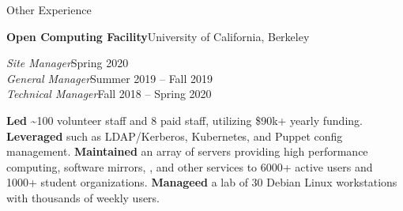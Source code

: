 




  \vspace{10pt}

  {\sectionfont Other Experience}

  \vspace{5pt}
  \textbf{Open Computing Facility}\quad{}\hfill University of California, Berkeley
  \begin{adjustwidth}{10pt}{}
    \emph{Site Manager}\hfill Spring 2020\\
    \emph{General Manager}\hfill Summer 2019 -- Fall 2019\\
    \emph{Technical Manager}\hfill Fall 2018 -- Spring 2020

    \textbf{Led} \textasciitilde{}100 volunteer staff and 8 paid staff, utilizing \$90k+ yearly funding.
    \textbf{Leveraged}  such as LDAP/Kerberos, Kubernetes, and Puppet config management.
    \textbf{Maintained} an array of servers providing high performance computing, software mirrors, , and other services to 6000+ active users and 1000+ student organizations.
    \textbf{Manageed} a lab of 30 Debian Linux workstations with thousands of weekly users.

  \end{adjustwidth}


